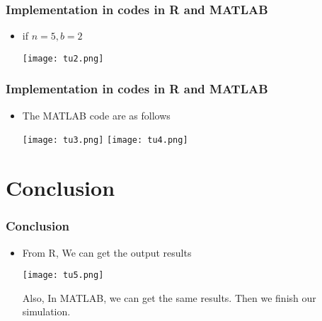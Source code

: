 \documentclass[12pt]{beamer}
\begin{document}
\begin{frame}
	\frametitle{Implementation in codes in R and MATLAB}
	\begin{itemize}
        \item if $n=5,b=2$
        \begin{center}
        \texttt{[image: tu2.png]}
        \end{center}
	\end{itemize}
\end{frame}



\begin{frame}
	\frametitle{Implementation in codes in R and MATLAB}
	\begin{itemize}
        \item The MATLAB code are as follows
        \begin{center}
        \texttt{[image: tu3.png]}
        \texttt{[image: tu4.png]}
        \end{center}
	\end{itemize}
\end{frame}


\section{Conclusion}
\begin{frame}
	\frametitle{Conclusion}
	\begin{itemize}
        \item From R, We can get the output results
        \begin{center}
        \texttt{[image: tu5.png]}
        \end{center}
     Also, In MATLAB, we can get the same results. Then we finish our simulation.
	\end{itemize}
\end{frame}
\end{document}
